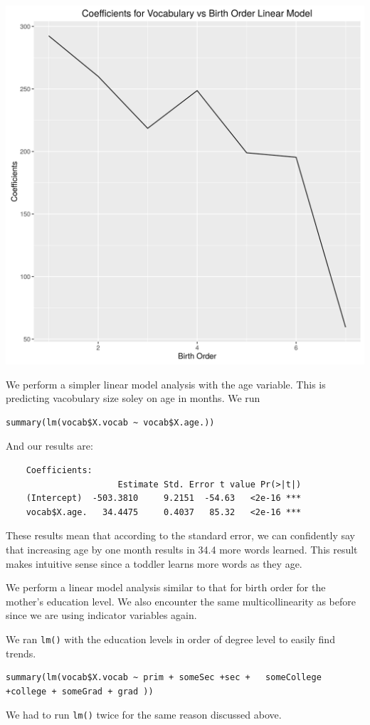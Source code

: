 \documentclass[fleqn]{article}
\begin{document}
	\includegraphics{BirthOrder.png}

	We perform a simpler linear model analysis with the age variable. This is predicting vacobulary size soley on age in months. We run
	\begin{verbatim}summary(lm(vocab$X.vocab ~ vocab$X.age.))\end{verbatim}
	And our results are:
	\begin{verbatim}
	Coefficients:
              	      Estimate Std. Error t value Pr(>|t|)
	(Intercept)  -503.3810     9.2151  -54.63   <2e-16 ***
	vocab$X.age.   34.4475     0.4037   85.32   <2e-16 ***
	\end{verbatim}
	These results mean that according to the standard error, we can confidently say that increasing age by one month results in 34.4 more words learned. This result makes intuitive sense since a toddler learns more words as they age.

	We perform a linear model analysis similar to that for birth order for the mother's education level. We also encounter the same multicollinearity as before since we are using indicator variables again.

	We ran \texttt{lm()} with the education levels in order of degree level to easily find trends.
	\begin{verbatim}summary(lm(vocab$X.vocab ~ prim + someSec +sec +   someCollege  +college + someGrad + grad ))\end{verbatim}
	We had to run \texttt{lm()} twice for the same reason discussed above.
\end{document}
